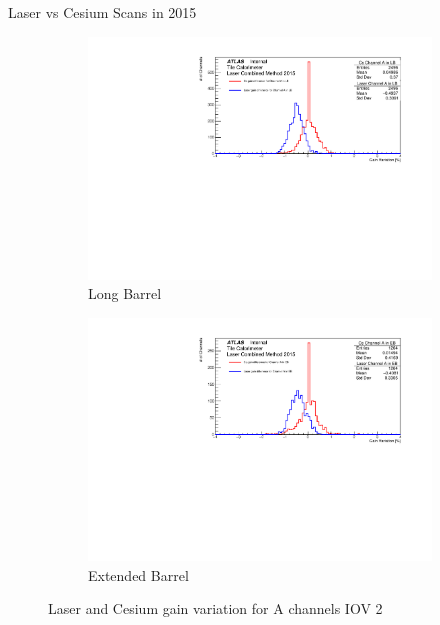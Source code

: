 \documentclass{beamer}
\begin{document}
\begin{frame}{Laser vs Cesium Scans in 2015}
\begin{figure}[H]
\centering
\begin{subfigure} [t] {0.49\textwidth}
\includegraphics[width=\textwidth]{cs1d_a_lb_iov2.pdf}
\caption{Long Barrel}
\end{subfigure}
\begin{subfigure} [t] {0.49\textwidth}
\includegraphics[width=\textwidth]{cs1d_a_eb_iov2.pdf}
\caption{Extended Barrel}
\end{subfigure}
\caption{Laser and Cesium gain variation for A channels IOV 2}
\end{figure}
\end{frame}
\end{document}
